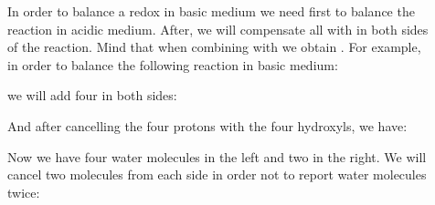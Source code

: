 \documentclass[main.tex]{subfiles}
\begin{document}
\begin{description}
 \item[] In order to balance a redox in basic medium we need first to balance the reaction in acidic medium. After, we will compensate all  with  in both sides of the reaction. Mind that when combining  with  we obtain . For example, in order to balance the following reaction in basic medium:
\begin{center}\end{center}
we will add four  in both sides:
\begin{center}\end{center}
And after cancelling the four protons with the four hydroxyls, we have:
\begin{center}\end{center}
Now we have four water molecules in the left and two in the right. We will cancel two molecules from each side in order not to report water molecules twice:
\begin{center}\end{center}





\end{description}
\end{document}
